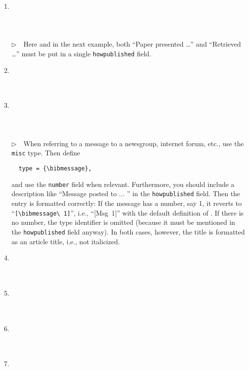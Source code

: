 \documentclass{article}
\newcommand{\EM}{\ensuremath{\triangleright\quad}}
\newcommand{\fieldname}[1]{\texttt{#1}}%
\newcommand{\entryname}[1]{\texttt{#1}}%
\newcommand{\cmd}[1]{\texttt{\string#1}}%
\begin{document}
\begin{enumerate}
\item \cite{ex83} \\ \cite{ex83}\\ \\  \\
      \EM Here and in the next example, both ``Paper presented \ldots''
      and ``Retrieved \ldots'' must be put in a single
      \fieldname{howpublished} field.
\item \cite{ex84} \\ \cite{ex84}\\ \\ 
\item \cite{ex85} \\ \cite{ex85}\\ \\  \\
      \EM When referring to a message to a newsgroup, internet forum, etc.,
      use the \entryname{misc} type. Then define
\begin{verbatim}
  type = {\bibmessage},
\end{verbatim}
      and use the \fieldname{number} field when relevant. Furthermore,
      you should include a description like ``Message posted to ... ''
      in the \fieldname{howpublished} field.  Then the entry is formatted
      correctly: If the message has a number, say 1, it reverts to
      ``\verb+[\bibmessage\ 1]+'', i.e., ``[Msg\ 1]'' with the default
      definition of \cmd{\bibmessage}. If there is no number, the
      type identifier is omitted (because it must be mentioned in the
      \fieldname{howpublished} field anyway). In both cases,
      however, the title is formatted as an article title, i.e., not
      italicized.
\item \cite{ex86} \\ \cite{ex86}\\ \\ 
\item \cite{ex87} \\ \cite{ex87}\\ \\ 
\item \cite{ex88} \\ \cite{ex88}\\ \\ 
\item \cite{ex89} \\ \cite{ex89}\\ \\ 

\end{enumerate}
\end{document}
